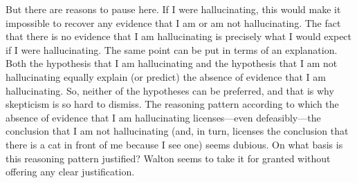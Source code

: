 \documentclass[12pt]{article}
\begin{document}
But there are reasons to pause here. If I were hallucinating, this would make 
it impossible to recover any evidence that I am or am not hallucinating. The fact that there is no
evidence that I am hallucinating is precisely what I would expect if I
were hallucinating. The same point can be put in terms of an explanation. 
Both the hypothesis that I am hallucinating and the hypothesis that I am not hallucinating 
equally explain (or predict) the absence of evidence that I am hallucinating.
So, neither of the hypotheses can be preferred, and that is why skepticism is so hard to dismiss.
The reasoning pattern according to which the absence of evidence that I am hallucinating 
licenses---even defeasibly---the conclusion that I am not hallucinating (and, in turn, licenses the conclusion that 
there is a cat in front of me because I see one) seems dubious. %
On what basis is this reasoning pattern justified?
Walton seems to take it for granted without 
offering any clear justification. %


\end{document}
